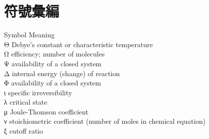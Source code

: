 %
\newpage
\chapter*{符號彙編}
\renewcommand{\thechapter}{符號彙編}

\setcounter{equation}{0}
\setcounter{figure}{0}
\setcounter{footnote}{0}
\setcounter{section}{0}
\setcounter{subsection}{0}
\setcounter{subsubsection}{0}
\setcounter{table}{0}

\noindent
Symbol      Meaning\\
Θ			Debye's constant or characteristic temperature\\
Ω			efficiency; number of molecules\\
Ψ			availability of a closed system\\
Δ			internal energy (change) of reaction\\
Φ			availability of a closed system\\
ι			specific irreversibility\\
λ			critical state\\
μ			Joule-Thomson coefficient\\
ν			stoichiometric coefficient (number of moles in chemical equation)\\
ξ			cutoff ratio
